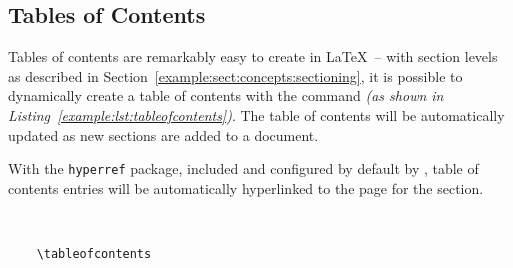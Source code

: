 \subsection{Tables of Contents}
Tables of contents are remarkably easy to create in \LaTeX\ -- with section levels as described in Section~\ref{example:sect:concepts:sectioning}, it is possible to dynamically create a table of contents with the  command \textit{(as shown in Listing~\ref{example:lst:tableofcontents})}. The table of contents will be automatically updated as new sections are added to a document.

With the \texttt{hyperref} package, included and configured by default by \uswdwmspkg{}, table of contents entries will be automatically hyperlinked to the page for the section.

\begin{listing}[H]
  \captionsetup{skip=\skiplistingcaptionlen}
  \begin{verbatim}
    
    
    \tableofcontents
  \end{verbatim}
  \caption{\texttt{\textbackslash tableofcontents} command example}
  \label{example:lst:tableofcontents}
\end{listing}

